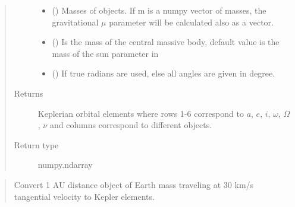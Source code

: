 \documentclass[letterpaper,10pt,english]{sphinxmanual}
\begin{document}
\begin{fulllineitems}
\begin{quote}
\begin{description}
\begin{itemize}
\item {} 
 () \textendash{} Masses of objects. If m is a numpy vector of masses, the gravitational \(\mu\) parameter will be calculated also as a vector.

\item {} 
 () \textendash{} Is the mass of the central massive body, default value is the mass of the sun parameter in {\hyperref[\detokenize{modules/dpt_tools:dpt_tools.M_sol}]{}}

\item {} 
 () \textendash{} If true radians are used, else all angles are given in degree.

\end{itemize}

\item[{Returns}] \leavevmode
Keplerian orbital elements where rows 1-6 correspond to \(a\), \(e\), \(i\), \(\omega\), \(\Omega\), \(\nu\) and columns correspond to different objects.

\item[{Return type}] \leavevmode
numpy.ndarray

\end{description}\end{quote}

\begin{quote}

Convert 1 AU distance object of Earth mass traveling at 30 km/s tangential velocity to Kepler elements.

%
\begin{sphinxVerbatim}[commandchars=\\\{\}]
   
   
   

  \PYG{p}{[}
   
   
   
   
   
   
\PYG{p}{]} 


\end{sphinxVerbatim}
\end{quote}
\end{fulllineitems}
\end{document}
